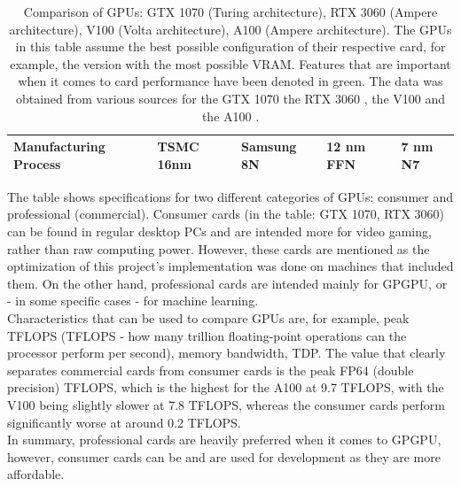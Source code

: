 \begin{table}[ht!]
\begin{tabular}{|>{\raggedright\arraybackslash\bfseries\scriptsize}m{2.7cm}|>{\scriptsize}m{2.7cm}|>{\scriptsize}m{2.7cm}|>{\scriptsize}m{2.7cm}|>{\scriptsize}m{2.7cm}|}
		\hline
		Manufacturing Process & TSMC 16nm & Samsung 8N & 12 nm FFN & 7 nm N7\\
		\hline
	\end{tabular}
	\caption{Comparison of GPUs: GTX 1070 (Turing architecture), RTX 3060 (Ampere architecture), V100 (Volta architecture), A100 (Ampere architecture). The GPUs in this table assume the best possible configuration of their respective card, for example, the version with the most possible VRAM. Features that are important when it comes to card performance have been denoted in green. The data was obtained from various sources for the GTX 1070 \cite{Hagedoorn6October2016, oaUUFoT7oI5ApIyY, Smith18May2016, jAnwkq6mMKYTLUOB} the RTX 3060 \cite{Walton7July2021, wGXr33zSUweXiQMY, SMhyh0H3oh3nlda0, May1December2020}, the V100 \cite{NvidiaAugust2017} and the A100 \cite{soj8qSRbfefUdi8Y, rfiOEXAGDlcAOxF3}.}
	\label{Table:theory-GPUs-GPGPU-nvidia-gpu-details-comparison}
\end{table}

The table shows specifications for two different categories of GPUs: consumer and professional (commercial). Consumer cards (in the table: GTX 1070, RTX 3060) can be found in regular desktop PCs and are intended more for video gaming, rather than raw computing power. However, these cards are mentioned as the optimization of this project's implementation was done on machines that included them. On the other hand, professional cards are intended mainly for GPGPU, or - in some specific cases - for machine learning. \\
Characteristics that can be used to compare GPUs are, for example, peak TFLOPS (TFLOPS - how many trillion floating-point operations can the processor perform per second), memory bandwidth, TDP. The value that clearly separates commercial cards from consumer cards is the peak FP64 (double precision) TFLOPS, which is the highest for the A100 at 9.7 TFLOPS, with the V100 being slightly slower at 7.8 TFLOPS, whereas the consumer cards perform significantly worse at around 0.2 TFLOPS. \\
In summary, professional cards are heavily preferred when it comes to GPGPU, however, consumer cards can be and are used for development as they are more affordable.




